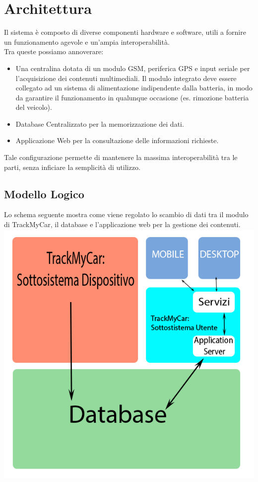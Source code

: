 \documentclass[a4paper,12pt]{article}
\begin{document}
\pagebreak

\section{Architettura}
Il sistema è composto di diverse componenti hardware e software, utili a fornire un funzionamento agevole  e un'ampia interoperabilità. \\
Tra queste possiamo annoverare: 
\begin{itemize}
\item Una centralina dotata di un modulo GSM, periferica GPS e input seriale per l'acquisizione dei contenuti multimediali.  Il modulo integrato deve essere collegato ad un sistema di alimentazione indipendente dalla batteria, in modo da garantire il funzionamento in qualunque occasione (es. rimozione batteria del veicolo).
\item Database Centralizzato per la memorizzazione dei dati.
\item Applicazione Web per la consultazione delle informazioni richieste.
\end{itemize}

Tale configurazione permette di mantenere la massima interoperabilità tra le parti, senza inficiare la semplicità di utilizzo.

\pagebreak

\subsection{Modello Logico}
Lo schema seguente mostra come viene regolato lo scambio di dati tra il modulo di TrackMyCar, il database e l'applicazione web per la gestione dei contenuti.\\

\includegraphics[scale=.65]{../IMG/ModLogico.png}
\pagebreak
\end{document}
